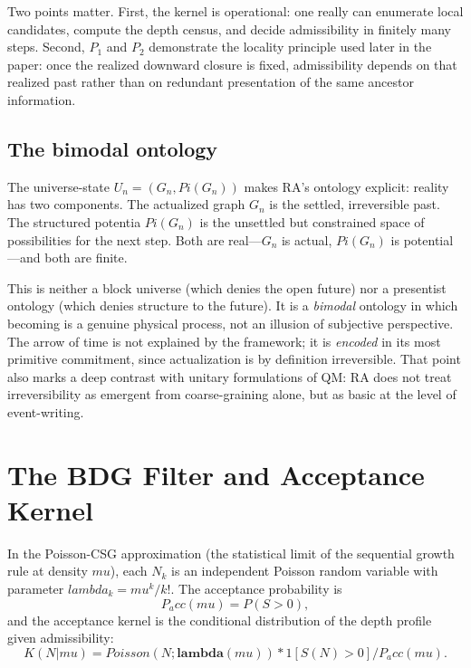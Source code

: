 \documentclass[11pt]{article}
\def\mu{mu}%
\def\Pi{Pi}%
\def\lambda{lambda}%
\def\mathrm#1{#1}%
\def\mathbf#1{#1}%
\def\mathbb#1{#1}%
\def\frac#1#2{#1/#2}%
\def\cdot{*}%
\def\Pacc{P_acc}%
\newcommand{\Pacc}{\ensuremath{P_{\mathrm{acc}}}}
\newcommand{\Pot}{\ensuremath{\Pi}}
\begin{document}
Two points matter. First, the kernel is operational: one really can enumerate local candidates, compute the depth census, and decide admissibility in finitely many steps. Second, $P_1$ and $P_2$ demonstrate the locality principle used later in the paper: once the realized downward closure is fixed, admissibility depends on that realized past rather than on redundant presentation of the same ancestor information.

\subsection{The bimodal ontology}

The universe-state $U_n=(G_n,\Pot(G_n))$ makes RA's ontology explicit: reality has two components. The actualized graph $G_n$ is the settled, irreversible past. The structured potentia $\Pot(G_n)$ is the unsettled but constrained space of possibilities for the next step. Both are real---$G_n$ is actual, $\Pot(G_n)$ is potential---and both are finite.

This is neither a block universe (which denies the open future) nor a presentist ontology (which denies structure to the future). It is a \emph{bimodal} ontology in which becoming is a genuine physical process, not an illusion of subjective perspective. The arrow of time is not explained by the framework; it is \emph{encoded} in its most primitive commitment, since actualization is by definition irreversible. That point also marks a deep contrast with unitary formulations of QM: RA does not treat irreversibility as emergent from coarse-graining alone, but as basic at the level of event-writing.

\section{The BDG Filter and Acceptance Kernel}
\label{sec:filter}

In the Poisson-CSG approximation (the statistical limit of the sequential growth rule at density $\mu$), each $N_k$ is an independent Poisson random variable with parameter $\lambda_k=\mu^k/k!$. The acceptance probability is
\begin{equation}
\Pacc(\mu)=\mathbb{P}(S>0),
\end{equation}
and the acceptance kernel is the conditional distribution of the depth profile given admissibility:
\begin{equation}
K(\mathbf{N}|\mu)=\frac{\mathrm{Poisson}(\mathbf{N};\boldsymbol{\lambda}(\mu))\cdot\mathbf{1}[S(\mathbf{N})>0]}{\Pacc(\mu)}.
\end{equation}
\end{document}
